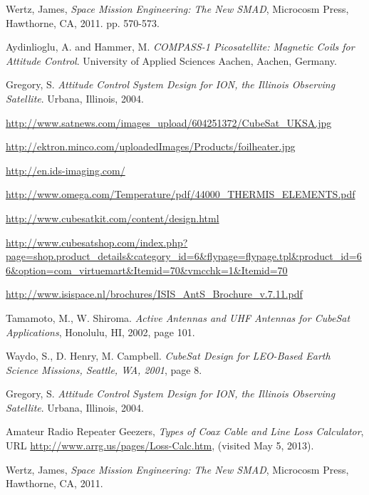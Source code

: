 \documentclass[12pt]{article}
\begin{document}
\begin{thebibliography}{9}
Wertz, James, \emph{Space Mission Engineering: The New SMAD}, Microcosm Press, Hawthorne, CA, 2011. pp. 570-573. 

Aydinlioglu, A. and Hammer, M. \emph{COMPASS-1 Picosatellite: Magnetic Coils for Attitude Control}. University of Applied Sciences Aachen, Aachen, Germany. 

Gregory, S. \emph{Attitude Control System Design for ION, the Illinois Observing Satellite}. Urbana, Illinois, 2004.

\url{http://www.satnews.com/images_upload/604251372/CubeSat_UKSA.jpg}

\url{http://ektron.minco.com/uploadedImages/Products/foilheater.jpg}

\url{http://en.ids-imaging.com/}

\url{http://www.omega.com/Temperature/pdf/44000_THERMIS_ELEMENTS.pdf}


\url{http://www.cubesatkit.com/content/design.html}

\url{http://www.cubesatshop.com/index.php?page=shop.product_details&category_id=6&flypage=flypage.tpl&product_id=66&option=com_virtuemart&Itemid=70&vmcchk=1&Itemid=70}

\url{http://www.isispace.nl/brochures/ISIS_AntS_Brochure_v.7.11.pdf}

Tamamoto, M., W. Shiroma. \emph{Active Antennas and UHF Antennas for CubeSat Applications}, Honolulu, HI, 2002, page 101.

Waydo, S., D. Henry, M. Campbell. \emph{CubeSat Design for LEO-Based Earth Science Missions, Seattle, WA, 2001}, page 8.


Gregory, S. \emph{Attitude Control System Design for ION, the Illinois Observing Satellite}. Urbana, Illinois, 2004. 

Amateur Radio Repeater Geezers, \emph{Types of Coax Cable and Line Loss Calculator}, URL \url{http://www.arrg.us/pages/Loss-Calc.htm}, (visited May 5, 2013).






Wertz, James, \emph{Space Mission Engineering: The New SMAD}, Microcosm Press, Hawthorne, CA, 2011.


\end{thebibliography}
\end{document}
